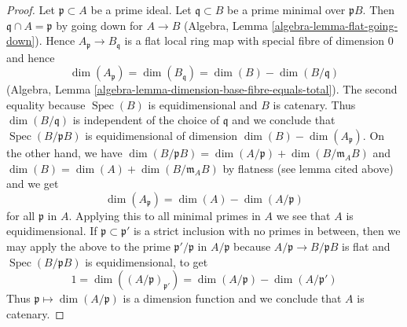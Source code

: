 \documentclass[10pt,a4paper]{amsart}
\theoremstyle{plain}
\theoremstyle{definition}
\theoremstyle{remark}
\numberwithin{equation}{subsection}
\def\Spec{\mathop{\mathrm{Spec}}}
\begin{document}
\begin{proof}
Let $\mathfrak p \subset A$ be a prime ideal. Let $\mathfrak q \subset B$
be a prime minimal over $\mathfrak pB$. Then $\mathfrak q \cap A = \mathfrak p$
by going down for $A \to B$
(Algebra, Lemma \ref{algebra-lemma-flat-going-down}).
Hence $A_\mathfrak p \to B_\mathfrak q$ is a flat local ring map
with special fibre of dimension $0$ and hence
$$
\dim(A_\mathfrak p) = \dim(B_\mathfrak q) = \dim(B) - \dim(B/\mathfrak q)
$$
(Algebra, Lemma \ref{algebra-lemma-dimension-base-fibre-equals-total}).
The second equality because $\Spec(B)$ is equidimensional and $B$ is catenary.
Thus $\dim(B/\mathfrak q)$ is independent of the choice of $\mathfrak q$
and we conclude that $\Spec(B/\mathfrak p B)$ is equidimensional of
dimension $\dim(B) - \dim(A_\mathfrak p)$. On the other hand, we
have
$\dim(B/\mathfrak p B) = \dim(A/\mathfrak p) + \dim(B/\mathfrak m_A B)$
and
$\dim(B) = \dim(A) + \dim(B/\mathfrak m_A B)$
by flatness (see lemma cited above) and we get
$$
\dim(A_\mathfrak p) = \dim(A) - \dim(A/\mathfrak p)
$$
for all $\mathfrak p$ in $A$. Applying this to all minimal primes in
$A$ we see that $A$ is equidimensional.
If $\mathfrak p \subset \mathfrak p'$ is a strict inclusion
with no primes in between, then we may apply the above to
the prime $\mathfrak p'/\mathfrak p$ in $A/\mathfrak p$
because $A/\mathfrak p \to B/\mathfrak p B$ is flat and
$\Spec(B/\mathfrak p B)$ is equidimensional, to get
$$
1 = \dim((A/\mathfrak p)_{\mathfrak p'}) =
\dim(A/\mathfrak p) - \dim(A/\mathfrak p')
$$
Thus $\mathfrak p \mapsto \dim(A/\mathfrak p)$ is a dimension
function and we conclude that $A$ is catenary.
\end{proof}
\end{document}
